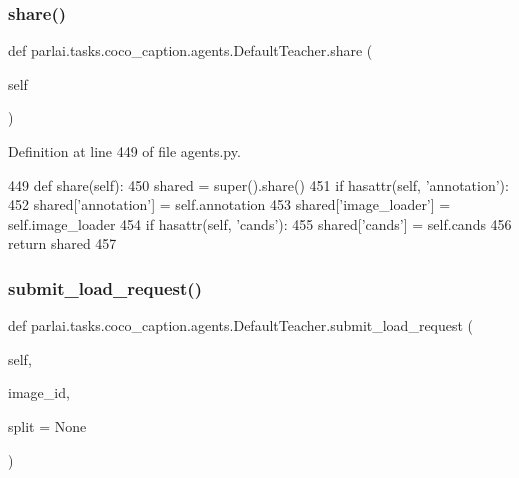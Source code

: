 \subsubsection{\texorpdfstring{share()}{share()}}
{\footnotesize\ttfamily def parlai.\+tasks.\+coco\+\_\+caption.\+agents.\+Default\+Teacher.\+share (\begin{DoxyParamCaption}\item[{}]{self }\end{DoxyParamCaption})}



Definition at line 449 of file agents.\+py.


\begin{DoxyCode}
449     \textcolor{keyword}{def }share(self):
450         shared = super().share()
451         \textcolor{keywordflow}{if} hasattr(self, \textcolor{stringliteral}{'annotation'}):
452             shared[\textcolor{stringliteral}{'annotation'}] = self.annotation
453         shared[\textcolor{stringliteral}{'image\_loader'}] = self.image\_loader
454         \textcolor{keywordflow}{if} hasattr(self, \textcolor{stringliteral}{'cands'}):
455             shared[\textcolor{stringliteral}{'cands'}] = self.cands
456         \textcolor{keywordflow}{return} shared
457 
\end{DoxyCode}
\mbox{\label{classparlai_1_1tasks_1_1coco__caption_1_1agents_1_1DefaultTeacher_ac6b0eb2ddf6dcf03a750221b886ffd9b}} 
\subsubsection{\texorpdfstring{submit\+\_\+load\+\_\+request()}{submit\_load\_request()}}
{\footnotesize\ttfamily def parlai.\+tasks.\+coco\+\_\+caption.\+agents.\+Default\+Teacher.\+submit\+\_\+load\+\_\+request (\begin{DoxyParamCaption}\item[{}]{self,  }\item[{}]{image\+\_\+id,  }\item[{}]{split = {\ttfamily None} }\end{DoxyParamCaption})}



